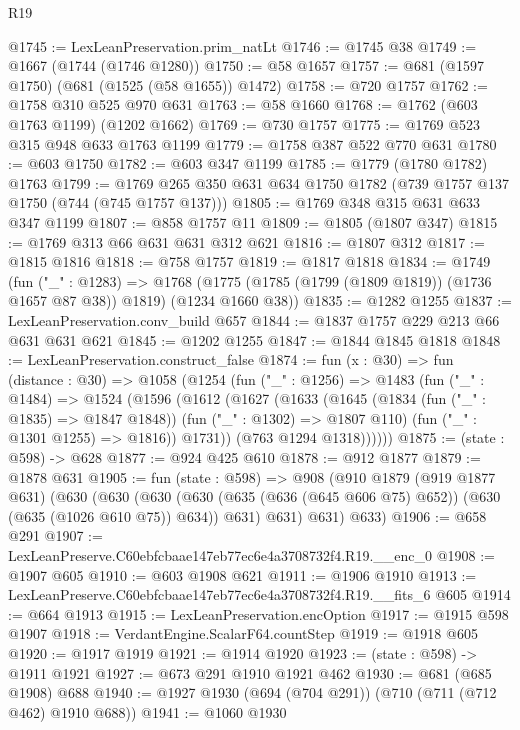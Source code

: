 \begin{lexlean}{R19}
\begin{coremodule}
@1745 := LexLeanPreservation.prim_natLt
@1746 := @1745 @38
@1749 := @1667 (@1744 (@1746 @1280))
@1750 := @58 @1657
@1757 := @681 (@1597 @1750) (@681 (@1525 (@58 @1655)) @1472)
@1758 := @720 @1757
@1762 := @1758 @310 @525 @970 @631
@1763 := @58 @1660
@1768 := @1762 (@603 @1763 @1199) (@1202 @1662)
@1769 := @730 @1757
@1775 := @1769 @523 @315 @948 @633 @1763 @1199
@1779 := @1758 @387 @522 @770 @631
@1780 := @603 @1750
@1782 := @603 @347 @1199
@1785 := @1779 (@1780 @1782) @1763
@1799 := @1769 @265 @350 @631 @634 @1750 @1782 (@739 @1757 @137 @1750 (@744 (@745 @1757 @137)))
@1805 := @1769 @348 @315 @631 @633 @347 @1199
@1807 := @858 @1757 @11
@1809 := @1805 (@1807 @347)
@1815 := @1769 @313 @66 @631 @631 @312 @621
@1816 := @1807 @312
@1817 := @1815 @1816
@1818 := @758 @1757
@1819 := @1817 @1818
@1834 := @1749
    (fun ("_" : @1283) =>
    @1768 (@1775 (@1785 (@1799 (@1809 @1819)) (@1736 @1657 @87 @38)) @1819) (@1234 @1660 @38))
@1835 := @1282 @1255
@1837 := LexLeanPreservation.conv_build @657
@1844 := @1837 @1757 @229 @213 @66 @631 @631 @621
@1845 := @1202 @1255
@1847 := @1844 @1845 @1818
@1848 := LexLeanPreservation.construct_false
@1874 := fun (x : @30) =>
  fun (distance : @30) =>
  @1058
    (@1254
      (fun ("_" : @1256) =>
      @1483
        (fun ("_" : @1484) =>
        @1524
          (@1596
            (@1612
              (@1627
                (@1633
                  (@1645
                    (@1834 (fun ("_" : @1835) => @1847 @1848))
                    (fun ("_" : @1302) => @1807 @110)
                    (fun ("_" : @1301 @1255) => @1816))
                  @1731))
              (@763 @1294 @1318))))))
@1875 := (state : @598) -> @628
@1877 := @924 @425 @610
@1878 := @912 @1877
@1879 := @1878 @631
@1905 := fun (state : @598) =>
  @908
    (@910
      @1879
      (@919 @1877 @631)
      (@630
        (@630
          (@630 (@630 (@635 (@636 (@645 @606 @75) @652)) (@630 (@635 (@1026 @610 @75)) @634)) @631)
          @631)
        @631)
      @633)
@1906 := @658 @291
@1907 := LexLeanPreserve.C60ebfcbaae147eb77ec6e4a3708732f4.R19.__enc_0
@1908 := @1907 @605
@1910 := @603 @1908 @621
@1911 := @1906 @1910
@1913 := LexLeanPreserve.C60ebfcbaae147eb77ec6e4a3708732f4.R19.__fits_6 @605
@1914 := @664 @1913
@1915 := LexLeanPreservation.encOption
@1917 := @1915 @598 @1907
@1918 := VerdantEngine.ScalarF64.countStep
@1919 := @1918 @605
@1920 := @1917 @1919
@1921 := @1914 @1920
@1923 := (state : @598) -> @1911 @1921
@1927 := @673 @291 @1910 @1921 @462
@1930 := @681 (@685 @1908) @688
@1940 := @1927 @1930 (@694 (@704 @291)) (@710 (@711 (@712 @462) @1910 @688))
@1941 := @1060 @1930

\end{coremodule}
\end{lexlean}
